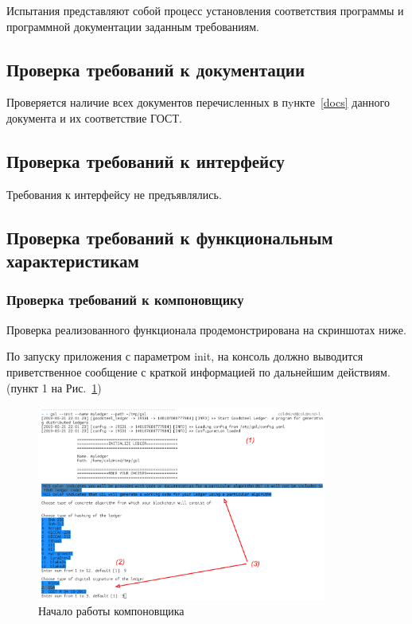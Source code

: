 Испытания представляют собой процесс установления соответствия программы и
программной документации заданным требованиям.

\subsection{Проверка требований к документации}
Проверяется наличие всех документов перечисленных в пyнкте~\ref{docs} данного
документа и их соответствие ГОСТ.

\subsection{Проверка требований к интерфейсу}
Требования к интерфейсу не предъявлялись.

\subsection{Проверка требований к функциональным характеристикам}

\subsubsection{Проверка требований к компоновщику}
Проверка реализованного функционала продемонстрирована на скриншотах ниже.

По запуску приложения с параметром {\small init}, на консоль должно выводится
приветственное сообщение с краткой информацией по дальнейшим действиям. (пункт 1 на Рис.~\ref{algs_choose})

\begin{figure}[h!]
    \centering
    \includegraphics[width=0.85\textwidth]{./screenshots/algs_choose}
    \caption{Начало работы компоновщика}\label{algs_choose}
\end{figure}

